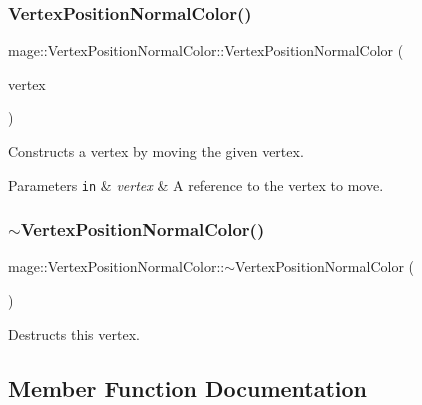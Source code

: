 \subsubsection{\texorpdfstring{Vertex\+Position\+Normal\+Color()}{VertexPositionNormalColor()}\hspace{0.1cm}{\footnotesize\ttfamily [4/4]}}
{\footnotesize\ttfamily mage\+::\+Vertex\+Position\+Normal\+Color\+::\+Vertex\+Position\+Normal\+Color (\begin{DoxyParamCaption}\item[{\hyperlink{structmage_1_1_vertex_position_normal_color}{Vertex\+Position\+Normal\+Color} \&\&}]{vertex }\end{DoxyParamCaption})\hspace{0.3cm}{\ttfamily [default]}}

Constructs a vertex by moving the given vertex.


\begin{DoxyParams}[1]{Parameters}
\mbox{\tt in}  & {\em vertex} & A reference to the vertex to move. \\
\hline
\end{DoxyParams}
\hypertarget{structmage_1_1_vertex_position_normal_color_a4c51d0599843601d1cc1a6a55149aafe}{}\label{structmage_1_1_vertex_position_normal_color_a4c51d0599843601d1cc1a6a55149aafe} 
\subsubsection{\texorpdfstring{$\sim$\+Vertex\+Position\+Normal\+Color()}{~VertexPositionNormalColor()}}
{\footnotesize\ttfamily mage\+::\+Vertex\+Position\+Normal\+Color\+::$\sim$\+Vertex\+Position\+Normal\+Color (\begin{DoxyParamCaption}{ }\end{DoxyParamCaption})\hspace{0.3cm}{\ttfamily [default]}}

Destructs this vertex. 

\subsection{Member Function Documentation}
\hypertarget{structmage_1_1_vertex_position_normal_color_ab59f21c8f7ae5cef563365fc9b7d34c7}{}\label{structmage_1_1_vertex_position_normal_color_ab59f21c8f7ae5cef563365fc9b7d34c7} 
